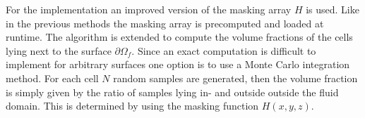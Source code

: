\begin{figure}[!bp]
    \centering
    \qquad
      \label{ibm_volfrac_montecarlo}
    \label{fig:example}%
\end{figure}

For the implementation an improved version of the masking array $H$ is used.
Like in the previous methods the masking array is precomputed and loaded at runtime. The algorithm is extended to compute the
volume fractions of the cells lying next to the surface $\partial\Omega_f$.
Since an exact computation is difficult to implement for arbitrary surfaces one option is to use a Monte Carlo integration method.
For each cell $N$ random samples are generated, then the volume fraction is simply given by the ratio of samples lying in- and outside outside the fluid domain.
This is determined by using the masking function $H(x, y, z)$.


